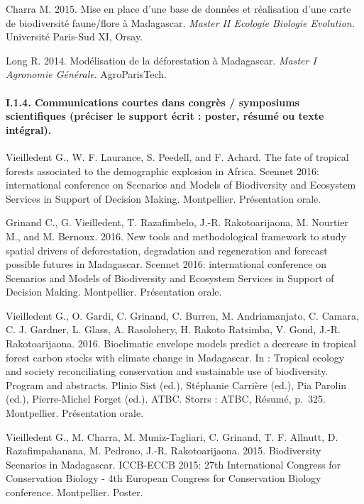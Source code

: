 \documentclass[12pt,]{article}
\let\oldparagraph\paragraph
\renewcommand{\paragraph}[1]{\oldparagraph{#1}\mbox{}}
\begin{document}
Charra M. 2015. Mise en place d'une base de données et réalisation d'une
carte de biodiversité faune/flore à Madagascar. \emph{Master II Ecologie
Biologie Evolution.} Université Paris-Sud XI, Orsay.

Long R. 2014. Modélisation de la déforestation à Madagascar.
\emph{Master I Agronomie Générale}. AgroParisTech.

\hypertarget{i.1.4.-communications-courtes-dans-congres-symposiums-scientifiques-preciser-le-support-ecrit-poster-resume-ou-texte-integral.}{%
\paragraph{I.1.4. Communications courtes dans congrès / symposiums
scientifiques (préciser le support écrit : poster, résumé ou texte
intégral).}\label{i.1.4.-communications-courtes-dans-congres-symposiums-scientifiques-preciser-le-support-ecrit-poster-resume-ou-texte-integral.}}

Vieilledent G., W. F. Laurance, S. Peedell, and F. Achard. The fate of
tropical forests associated to the demographic explosion in Africa.
Scennet 2016: international conference on Scenarios and Models of
Biodiversity and Ecosystem Services in Support of Decision Making.
Montpellier. Présentation orale.

Grinand C., G. Vieilledent, T. Razafimbelo, J.-R. Rakotoarijaona, M.
Nourtier M., and M. Bernoux. 2016. New tools and methodological
framework to study spatial drivers of deforestation, degradation and
regeneration and forecast possible futures in Madagascar. Scennet 2016:
international conference on Scenarios and Models of Biodiversity and
Ecosystem Services in Support of Decision Making. Montpellier.
Présentation orale.

Vieilledent G., O. Gardi, C. Grinand, C. Burren, M. Andriamanjato, C.
Camara, C. J. Gardner, L. Glass, A. Rasolohery, H. Rakoto Ratsimba, V.
Gond, J.-R. Rakotoarijaona. 2016. Bioclimatic envelope models predict a
decrease in tropical forest carbon stocks with climate change in
Madagascar. In : Tropical ecology and society reconciliating
conservation and sustainable use of biodiversity. Program and abstracts.
Plinio Sist (ed.), Stéphanie Carrière (ed.), Pia Parolin (ed.),
Pierre-Michel Forget (ed.). ATBC. Storrs : ATBC, Résumé, p.~325.
Montpellier. Présentation orale.

Vieilledent G., M. Charra, M. Muniz-Tagliari, C. Grinand, T. F. Allnutt,
D. Razafimpahanana, M. Pedrono, J.-R. Rakotoarijaona. 2015. Biodiversity
Scenarios in Madagascar. ICCB-ECCB 2015: 27th International Congress for
Conservation Biology - 4th European Congress for Conservation Biology
conference. Montpellier. Poster.
\end{document}
